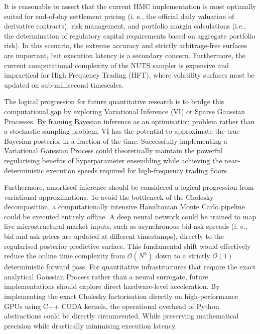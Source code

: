 \documentclass[12pt,oneside]{report}
\theoremstyle{definition}
\theoremstyle{remark}
\begin{document}
It is reasonable to assert that the current HMC implementation is most optimally suited for end-of-day settlement pricing (i. e., the official daily valuation of derivative contracts), risk management, and portfolio margin calculations (i.e., the determination of regulatory capital requirements based on aggregate portfolio risk). In this scenario, the extreme accuracy and strictly arbitrage-free surfaces are important, but execution latency is a secondary concern. Furthermore, the current computational complexity of the NUTS sampler \cite{hoffman2014nuts} is expensive and impractical for High Frequency Trading (HFT), where volatility surfaces must be updated on sub-millisecond timescales.

The logical progression for future quantitative research is to bridge this computational gap by exploring Variational Inference (VI) or Sparse Gaussian Processes. By framing Bayesian inference as an optimisation problem rather than a stochastic sampling problem, VI has the potential to approximate the true Bayesian posterior in a fraction of the time. Successfully implementing a Variational Gaussian Process could theoretically maintain the powerful regularising benefits of hyperparameter ensembling while achieving the near-deterministic execution speeds required for high-frequency trading floors. 

Furthermore, amortised inference should be considered a logical progression from variational approximations. To avoid the bottleneck of the Cholesky decomposition, a computationally intensive Hamiltonian Monte Carlo pipeline could be executed entirely offline. A deep neural network could be trained to map live microstructural market inputs, such as asynchronous bid-ask spreads (i. e., bid and ask prices are updated at different timestamps), directly to the regularised posterior predictive surface. This fundamental shift would effectively reduce the online time complexity from $\mathcal{O}(N^3)$ down to a strictly $\mathcal{O}(1)$ deterministic forward pass. For quantitative infrastructures that require the exact analytical Gaussian Process rather than a neural surrogate, future implementations should explore direct hardware-level acceleration. By implementing the exact Cholesky factorisation directly on high-performance GPUs using C++ CUDA kernels, the operational overhead of Python abstractions could be directly circumvented. While preserving mathematical precision while drastically minimising execution latency.

\appendix
\end{document}
